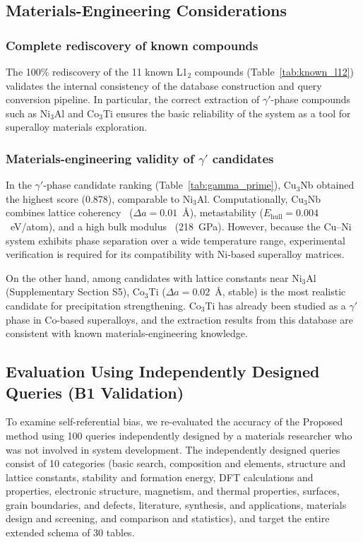 \documentclass[5p,twocolumn]{elsarticle}
\begin{document}
\subsection{Materials-Engineering Considerations}

\subsubsection{Complete rediscovery of known compounds}

The 100\% rediscovery of the 11 known L1$_2$ compounds (Table~\ref{tab:known_l12})
validates the internal consistency of the database construction and query conversion pipeline.
In particular, the correct extraction of $\gamma'$-phase compounds such as Ni$_3$Al and Co$_3$Ti
ensures the basic reliability of the system as a tool for superalloy materials exploration.

\subsubsection{Materials-engineering validity of $\gamma'$ candidates}

In the $\gamma'$-phase candidate ranking (Table~\ref{tab:gamma_prime}), Cu$_3$Nb obtained
the highest score (0.878), comparable to Ni$_3$Al.
Computationally, Cu$_3$Nb combines lattice coherency~\citep{vegard1921constitution} ($\Delta a = 0.01$~\AA),
metastability ($E_\text{hull} = 0.004$~eV/atom),
and a high bulk modulus~\citep{king1966volume} (218~GPa).
However, because the Cu--Ni system exhibits phase separation over a wide temperature range,
experimental verification is required for its compatibility with Ni-based superalloy matrices.

On the other hand, among candidates with lattice constants near Ni$_3$Al (Supplementary Section S5),
Co$_3$Ti ($\Delta a = 0.02$~\AA, stable) is the most realistic candidate for precipitation strengthening.
Co$_3$Ti has already been studied as a $\gamma'$ phase in Co-based superalloys,
and the extraction results from this database are consistent with known materials-engineering knowledge.

\subsection{Evaluation Using Independently Designed Queries (B1 Validation)}
\label{sec:independent_eval}

To examine self-referential bias, we re-evaluated the accuracy of the Proposed method
using 100 queries independently designed by a materials researcher
who was not involved in system development.
The independently designed queries consist of 10 categories (basic search, composition and elements, structure and lattice constants,
stability and formation energy, DFT calculations and properties, electronic structure, magnetism, and thermal properties,
surfaces, grain boundaries, and defects, literature, synthesis, and applications, materials design and screening,
and comparison and statistics), and target the entire extended schema of 30 tables.
\end{document}
